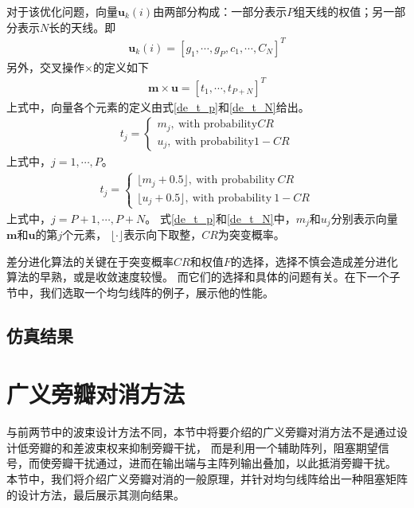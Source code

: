 \documentclass[master]{thesis-uestc}
\begin{document}
对于该优化问题，向量$\bm{u}_k(i)$由两部分构成：一部分表示$P$组天线的权值；另一部分表示$N$长的天线。即
\begin{equation}
    \begin{aligned}
        \bm{u}_k(i) = \left[g_1,\cdots,g_P,c_1,\cdots,C_N\right]^T
    \end{aligned}
\end{equation}
另外，交叉操作$\times$的定义如下
\begin{equation}
    \begin{aligned}
        \bm{m} \times \bm{u} = \left[t_1, \cdots, t_{P+N}\right]^T
    \end{aligned}
\end{equation}
上式中，向量各个元素的定义由式\eqref{de_t_p}和\eqref{de_t_N}给出。
\begin{equation}\label{de_t_p}
    \begin{aligned}
        t_j = 
        \begin{cases}
            m_j, ~ \text{with probability} CR \\
            u_j, ~ \text{with probability} 1 - CR
        \end{cases}
    \end{aligned}
\end{equation}
上式中，$j=1,\cdots,P$。
\begin{equation}\label{de_t_N}
    \begin{aligned}
        t_j = 
        \begin{cases}
            \lfloor m_j+0.5 \rfloor, ~ \text{with probability} ~ CR \\
            \lfloor u_j+0.5 \rfloor, ~ \text{with probability} ~ 1 - CR
        \end{cases}
    \end{aligned}
\end{equation}
上式中，$j=P+1,\cdots,P+N$。
式\eqref{de_t_p}和\eqref{de_t_N}中，$m_j$和$u_j$分别表示向量$\bm{m}$和$\bm{u}$的第$j$个元素，
$\lfloor\cdot\rfloor$表示向下取整，$CR$为突变概率。

差分进化算法的关键在于突变概率$CR$和权值$F$的选择，选择不慎会造成差分进化算法的早熟，或是收敛速度较慢。
而它们的选择和具体的问题有关。在下一个子节中，我们选取一个均匀线阵的例子，展示他的性能。

\subsection{仿真结果}

\section{广义旁瓣对消方法}
与前两节中的波束设计方法不同，本节中将要介绍的广义旁瓣对消方法不是通过设计低旁瓣的和差波束权来抑制旁瓣干扰，
而是利用一个辅助阵列，阻塞期望信号，而使旁瓣干扰通过，进而在输出端与主阵列输出叠加，以此抵消旁瓣干扰。
本节中，我们将介绍广义旁瓣对消的一般原理，并针对均匀线阵给出一种阻塞矩阵的设计方法，最后展示其测向结果。
\end{document}
